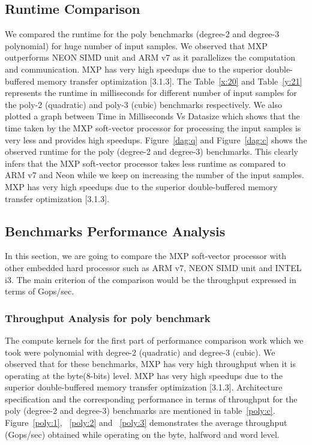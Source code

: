 \subsection{Runtime Comparison}
We compared the runtime for the poly benchmarks (degree-2 and degree-3 polynomial) for huge number of input samples. We observed that MXP outperforms NEON SIMD unit and ARM v7 as it parallelizes the computation and communication. MXP has very high speedups due to the superior double-buffered memory transfer optimization [3.1.3]. The Table~\ref{x:20} and Table~\ref{y:21} represents the runtime in milliseconds for different number of input samples for the poly-2 (quadratic) and poly-3 (cubic) benchmarks respectively. We also plotted a graph between Time in Milliseconds Vs Datasize which shows that the time taken by the MXP soft-vector processor for processing the input samples is very less and provides high speedups. Figure~\ref{dag:q} and Figure~\ref{dag:c} shows the observed runtime for the poly (degree-2 and degree-3) benchmarks. This clearly infers that the MXP soft-vector processor takes less runtime as compared to ARM v7 and Neon while we keep on increasing the number of the input samples. MXP has very high speedups due to the superior double-buffered memory transfer optimization [3.1.3].












\subsection{Benchmarks Performance Analysis}
In this section, we are going to compare the MXP soft-vector processor with other embedded hard processor such as ARM v7, NEON SIMD unit and INTEL i3. The main criterion of the comparison would be the throughput expressed in terms of Gops/sec.

\subsubsection{Throughput Analysis for poly benchmark}

The compute kernels for the first part of performance comparison work which we took were polynomial with degree-2 (quadratic) and degree-3 (cubic).
We observed that for these benchmarks, MXP has very high throughput when it is operating at the byte(8-bits) level. MXP has very high speedups due to the superior double-buffered memory transfer optimization [3.1.3]. Architecture specification and the corresponding performance in terms of throughput for the poly (degree-2 and degree-3) benchmarks are mentioned in table~\ref{poly:c}.  Figure~\ref{poly:1}, ~\ref{poly:2} and ~\ref{poly:3} demonstrates the average throughput (Gops/sec) obtained while operating on the byte, halfword and word level.

